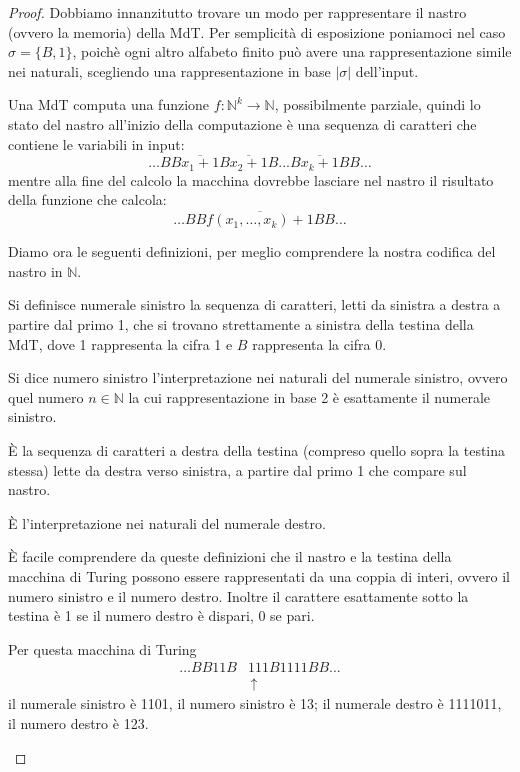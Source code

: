 \begin{proof}
Dobbiamo innanzitutto trovare un modo per rappresentare il nastro (ovvero la
memoria) della MdT. Per semplicità di esposizione poniamoci nel caso $\sigma =
\{ B, 1 \}$, poichè ogni altro alfabeto finito può avere una rappresentazione
simile nei naturali, scegliendo una rappresentazione in base $|\sigma|$
dell'input.

Una MdT computa una funzione $f: \mathbb{N}^k \rightarrow \mathbb{N}$,
possibilmente parziale, quindi lo stato del nastro all'inizio della
computazione è una sequenza di caratteri che contiene le variabili in
input:
$$\dots BB\overline{x_1+1}B\overline{x_2+1}B...B\overline{x_k+1}BB\dots $$
mentre alla fine del calcolo la macchina dovrebbe lasciare nel nastro
il risultato della funzione che calcola:
$$\dots BB\overline{f(x_1,\dots,x_k)+1}BB\dots $$

Diamo ora le seguenti definizioni, per meglio comprendere la nostra codifica
del nastro in $\mathbb{N}$.

\begin{defi}
Si definisce numerale sinistro la sequenza di caratteri, letti da sinistra a
destra a partire dal primo 1, che si trovano strettamente a sinistra della
testina della MdT, dove 1 rappresenta la cifra 1 e $B$ rappresenta la cifra 0.
\end{defi}
\begin{defi}
Si dice numero sinistro l'interpretazione nei naturali del numerale sinistro,
ovvero quel numero $n \in \mathbb{N}$ la cui rappresentazione in base 2 è
esattamente il numerale sinistro.
\end{defi}
\begin{defi}
È la sequenza di caratteri a destra della testina (compreso quello sopra la
testina stessa) lette da destra verso sinistra, a partire dal primo 1 che
compare sul nastro.
\end{defi}
\begin{defi}
È l'interpretazione nei naturali del numerale destro.
\end{defi}

È facile comprendere da queste definizioni che il nastro e la testina della
macchina di Turing possono essere rappresentati da una coppia di interi, ovvero
il numero sinistro e il numero destro. Inoltre il carattere esattamente sotto
la testina è 1 se il numero destro è dispari, 0 se pari.

\begin{esempio}
Per questa macchina di Turing
\begin{align*}
\dots BB11B&111B1111BB \dots\\
&\,\uparrow
\end{align*}
il numerale sinistro è 1101, il numero sinistro è 13; il numerale destro è
1111011, il numero destro è 123.
\end{esempio}


\end{proof}
